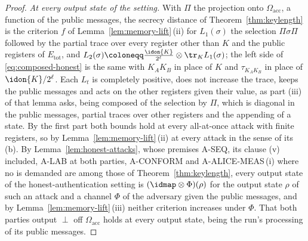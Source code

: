 \begin{proof}
\emph{At every output state of the setting.} With $\Pi$ the projection onto
$\Omega_{\mathrm{acc}}$, a function of the public messages, the secrecy
distance of Theorem~\ref{thm:keylength} is the criterion $f$ of
Lemma~\ref{lem:memory-lift}\,(ii) for $L_1(\sigma)$ the selection
$\Pi\sigma\Pi$ followed by the partial trace over every register other than
$K$ and the public registers of $E_{\mathrm{tot}}$, and
$L_2(\sigma)\coloneqq\frac{\idon{K}}{2^{\ell}}\otimes\tr_KL_1(\sigma)$; the
left side of \eqref{eq:composed-honest} is the same with $K_AK_B$ in place of
$K$ and $\tau_{K_AK_B}$ in place of $\idon{K}/2^{\ell}$. Each $L_t$ is
completely positive, does not increase the trace, keeps the public messages
and acts on the other registers given their value, as part (iii) of that
lemma asks, being composed of the selection by $\Pi$, which is diagonal in
the public messages, partial traces over other registers and the appending
of a state. By the first part both bounds hold at every all-at-once attack
with finite registers, so by Lemma~\ref{lem:memory-lift}\,(ii) at every attack
in the sense of its (b). By Lemma~\ref{lem:honest-attacks}, whose premises
A-SEQ, its clause (v) included, A-LAB at both parties, A-CONFORM and
A-ALICE-MEAS\,(i) where no  is demanded
are among those of Theorem~\ref{thm:keylength}, every output state of the
honest-authentication setting is $(\idmap\otimes\Phi)(\rho)$ for the output
state $\rho$ of such an attack and a channel $\Phi$ of the adversary given
the public messages, and by Lemma~\ref{lem:memory-lift}\,(iii) neither
criterion increases under $\Phi$. That both parties output $\perp$ off
$\Omega_{\mathrm{acc}}$ holds at every output state, being the run's
processing of its public messages.


\end{proof}
